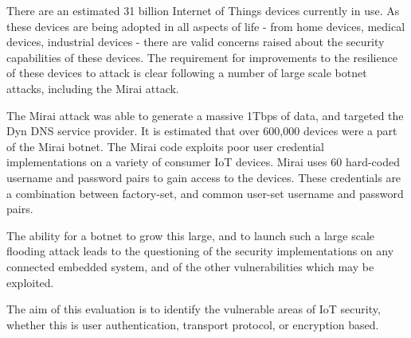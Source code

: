 There are an estimated 31 billion Internet of Things devices currently in
use\cite{jan13}.
As these devices are being adopted in all aspects of life - from home devices,
medical devices, industrial devices - there are valid concerns raised about the
security capabilities of these devices. The requirement for improvements to the
resilience of these devices to attack is clear following a number of large scale
botnet attacks, including the Mirai attack.

The Mirai attack was able to generate a massive 1Tbps of data, and targeted the
Dyn DNS service provider. It is estimated that over 600,000 devices were
a part of the Mirai botnet. The Mirai code exploits poor user credential
implementations on a variety of consumer IoT devices. Mirai uses 60 hard-coded
username and password pairs to gain access to the devices. These credentials are
a combination between factory-set, and common user-set username and password
pairs.

The ability for a botnet to grow this large, and to launch such a large scale
flooding attack leads to the questioning of the security implementations on any
connected embedded system, and of the other vulnerabilities which may be
exploited.

The aim of this evaluation is to identify the vulnerable areas of IoT security,
whether this is user authentication, transport protocol, or encryption based.
